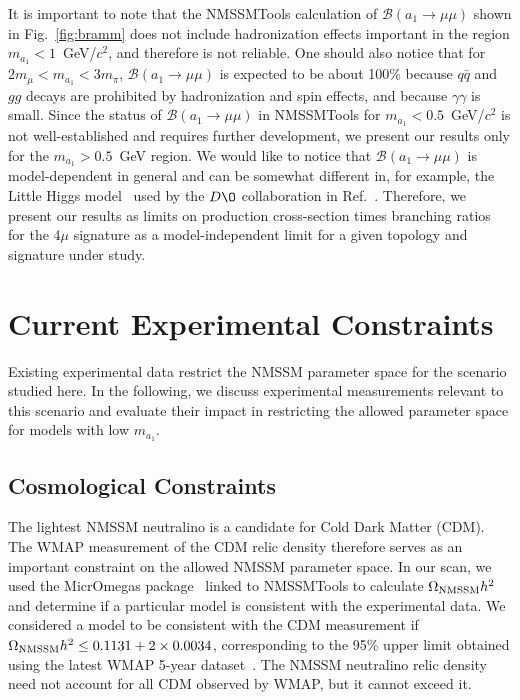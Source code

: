 \documentclass[aps,prl,twocolumn,nofootinbib,superscriptaddress]{revtex4}
\begin{document}
It is important to note that the NMSSMTools calculation of
$\mathcal{B}(a_1 \to \mu \mu)$ shown in Fig.~\ref{fig:bramm} does not
include hadronization effects important in the region $m_{a_1} <
1$~GeV/$c^2$, and therefore is not reliable.  One should also notice
that for $2m_\mu < m_{a_1} < 3m_\pi$, $\mathcal{B}(a_1 \to \mu\mu)$ is expected
to be about 100\% because $q\bar{q}$ and $gg$ decays are prohibited by
hadronization and spin effects, and because $\gamma\gamma$ is small.
Since the status of $\mathcal{B}(a_1 \to \mu \mu)$ in NMSSMTools for
$m_{a_1} < 0.5$~GeV/$c^2$ is not well-established and requires further
development, we present our results only for the $m_{a_1} > 0.5$~GeV
region.  We would like to notice that $\mathcal{B}(a_1 \to \mu \mu)$
is model-dependent in general and can be somewhat different in, for
example, the Little Higgs model~\cite{LHiggsADecays} used by the $D\O$
collaboration in Ref.~\cite{Abazov:2009yi}.  Therefore, we present our
results as limits on production cross-section times branching ratios
for the $4\mu$ signature as a model-independent limit for a given
topology and signature under study.

\section{Current Experimental Constraints}

Existing experimental data restrict the NMSSM parameter space for the
scenario studied here.  In the following, we discuss experimental
measurements relevant to this scenario and evaluate their impact in
restricting the allowed parameter space for models with low $m_{a_1}$.

\subsection{Cosmological Constraints}

The lightest NMSSM neutralino is a candidate for Cold Dark Matter
(CDM).  The WMAP measurement of the CDM relic density therefore serves
as an important constraint on the allowed NMSSM parameter space.  In
our scan, we used the MicrOmegas package~\cite{micrOmegas} linked to
NMSSMTools to calculate $\Omega_{\mbox{\scriptsize NMSSM}}h^2$ and
determine if a particular model is consistent with the experimental
data.  We considered a model to be consistent with the CDM measurement
if $\Omega_{\mbox{\scriptsize NMSSM}}h^2 \le 0.1131 + 2\times0.0034$,
corresponding to the 95\% upper limit obtained using the latest WMAP
5-year dataset~\cite{wmap}.  The NMSSM neutralino relic density need
not account for all CDM observed by WMAP, but it cannot exceed it.
\end{document}
